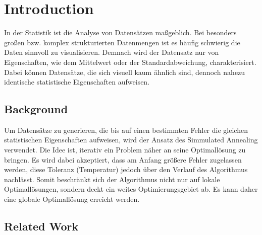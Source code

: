 \documentclass[sigconf]{acmart}
\begin{document}


\maketitle

\let\thefootnote\relax{}


\section{Introduction}

In der Statistik ist die Analyse von Datensätzen maßgeblich. Bei besonders großen bzw. komplex strukturierten Datenmengen ist es häufig schwierig die Daten sinnvoll zu visualisieren. Demnach wird der Datensatz nur von Eigenschaften, wie dem Mittelwert oder der Standardabweichung, charakterisiert. Dabei können Datensätze, die sich visuell kaum ähnlich sind, dennoch nahezu identische statistische Eigenschaften aufweisen.  

\subsection{Background}

Um Datensätze zu generieren, die bis auf einen bestimmten Fehler die gleichen statistischen Eigenschaften aufweisen, wird der Ansatz des Simmulated Annealing verwendet. Die Idee ist, iterativ ein Problem näher an seine Optimallösung zu bringen. Es wird dabei akzeptiert, dass am Anfang größere Fehler zugelassen werden, diese Toleranz (Temperatur) jedoch über den Verlauf des Algorithmus nachlässt. Somit beschränkt sich der Algorithmus nicht nur auf lokale Optimallösungen, sondern deckt ein weites Optimierungsgebiet ab. Es kann daher eine globale Optimallösung erreicht werden. 

\subsection{Related Work}
\end{document}
